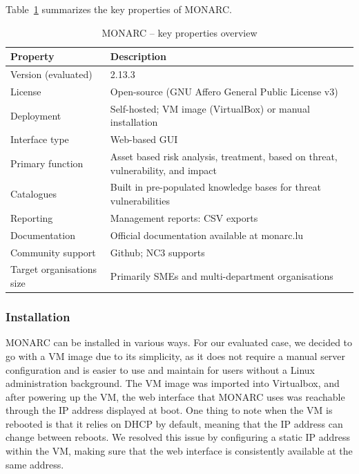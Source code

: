 Table~\ref{tab:monarc-overview} summarizes the key properties of MONARC.

\begin{table}[h!]
\centering
\renewcommand{\arraystretch}{1.3}
\begin{tabular}{|p{4.5cm}|p{9cm}|}
\hline 
\textbf{Property} & \textbf{Description} \\
\hline
Version (evaluated) & 2.13.3 \\
\hline
License & Open-source (GNU Affero General Public License v3) \\
\hline
Deployment & Self-hosted; VM image (VirtualBox) or manual installation \\ 
\hline
Interface type & Web-based GUI \\ 
\hline
Primary function & Asset based risk analysis, treatment, based on threat, vulnerability, and impact \\
\hline
Catalogues & Built in pre-populated knowledge bases for threat vulnerabilities \\
\hline
Reporting & Management reports: CSV exports \\
\hline
Documentation & Official documentation available at monarc.lu \\
\hline
Community support  & Github; NC3 supports \\
\hline
Target organisations size & Primarily SMEs and multi-department organisations \\
\hline
\end{tabular}
\caption{MONARC -- key properties overview}
\label{tab:monarc-overview}
\end{table}

\subsubsection{Installation}
MONARC can be installed in various ways. For our evaluated case, we decided to go with a VM image due to its simplicity, as it does not require a manual server configuration and is easier to use and maintain for users without a Linux administration background. The VM image was imported into Virtualbox, and after powering up the VM, the web interface that MONARC uses was reachable through the IP address displayed at boot. One thing to note when the VM is rebooted is that it relies on DHCP by default, meaning that the IP address can change between reboots. We resolved this issue by configuring a static IP address within the VM, making sure that the web interface is consistently available at the same address. 

